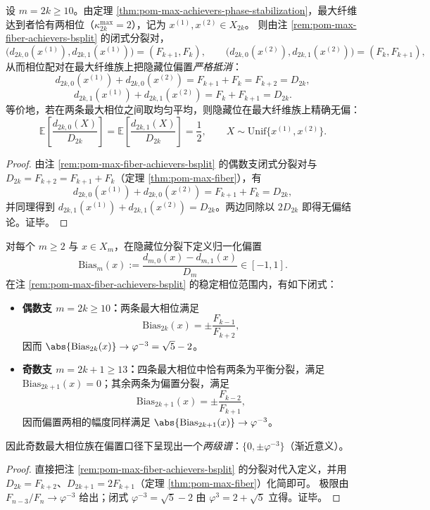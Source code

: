 \begin{corollary}\label{cor:pom-max-fiber-hidden-bit-unbiased}
设 \(m=2k\ge 10\)。由定理 \ref{thm:pom-max-achievers-phase-stabilization}，最大纤维达到者恰有两相位（\(\kappa^{\mathrm{max}}_{2k}=2\)），记为 \(x^{(1)},x^{(2)}\in X_{2k}\)。
则由注 \ref{rem:pom-max-fiber-achievers-bsplit} 的闭式分裂对，
\[
\bigl(d_{2k,0}(x^{(1)}),d_{2k,1}(x^{(1)})\bigr)=(F_{k+1},F_k),
\qquad
\bigl(d_{2k,0}(x^{(2)}),d_{2k,1}(x^{(2)})\bigr)=(F_k,F_{k+1}),
\]
从而相位配对在最大纤维族上把隐藏位偏置\emph{严格抵消}：
\[
d_{2k,0}(x^{(1)})+d_{2k,0}(x^{(2)})=F_{k+1}+F_k=F_{k+2}=D_{2k},
\]
\[
d_{2k,1}(x^{(1)})+d_{2k,1}(x^{(2)})=F_k+F_{k+1}=D_{2k}.
\]
等价地，若在两条最大相位之间取均匀平均，则隐藏位在最大纤维族上精确无偏：
\[
\mathbb{E}\!\left[\frac{d_{2k,0}(X)}{D_{2k}}\right]
=\mathbb{E}\!\left[\frac{d_{2k,1}(X)}{D_{2k}}\right]
=\frac12,\qquad X\sim\mathrm{Unif}\{x^{(1)},x^{(2)}\}.
\]
\end{corollary}

\begin{proof}
由注 \ref{rem:pom-max-fiber-achievers-bsplit} 的偶数支闭式分裂对与 \(D_{2k}=F_{k+2}=F_{k+1}+F_k\)（定理 \ref{thm:pom-max-fiber}），有
\[
d_{2k,0}(x^{(1)})+d_{2k,0}(x^{(2)})=F_{k+1}+F_k=D_{2k},
\]
并同理得到 \(d_{2k,1}(x^{(1)})+d_{2k,1}(x^{(2)})=D_{2k}\)。两边同除以 \(2D_{2k}\) 即得无偏结论。证毕。
\end{proof}

\begin{corollary}\label{cor:pom-max-fiber-hidden-bit-bias-spectrum}
对每个 \(m\ge 2\) 与 \(x\in X_m\)，在隐藏位分裂下定义归一化偏置
\[
\mathrm{Bias}_m(x):=\frac{d_{m,0}(x)-d_{m,1}(x)}{D_m}\in[-1,1].
\]
在注 \ref{rem:pom-max-fiber-achievers-bsplit} 的稳定相位范围内，有如下闭式：
\begin{itemize}
  \item \textbf{偶数支 \(m=2k\ge 10\)：}两条最大相位满足
  \[
  \mathrm{Bias}_{2k}(x)=\pm\frac{F_{k-1}}{F_{k+2}},
  \]
  因而 \(\abs{\mathrm{Bias}_{2k}(x)}\to \varphi^{-3}=\sqrt5-2\)。
  \item \textbf{奇数支 \(m=2k+1\ge 13\)：}四条最大相位中恰有两条为平衡分裂，满足 \(\mathrm{Bias}_{2k+1}(x)=0\)；其余两条为偏置分裂，满足
  \[
  \mathrm{Bias}_{2k+1}(x)=\pm\frac{F_{k-2}}{F_{k+1}},
  \]
  因而偏置两相的幅度同样满足 \(\abs{\mathrm{Bias}_{2k+1}(x)}\to \varphi^{-3}\)。
\end{itemize}
因此奇数最大相位族在偏置口径下呈现出一个\emph{两级谱}：\(\{0,\pm\varphi^{-3}\}\)（渐近意义）。
\end{corollary}
\begin{proof}
直接把注 \ref{rem:pom-max-fiber-achievers-bsplit} 的分裂对代入定义，并用 \(D_{2k}=F_{k+2}\)、\(D_{2k+1}=2F_{k+1}\)（定理 \ref{thm:pom-max-fiber}）化简即可。
极限由 \(F_{n-3}/F_n\to \varphi^{-3}\) 给出；闭式 \(\varphi^{-3}=\sqrt5-2\) 由 \(\varphi^3=2+\sqrt5\) 立得。证毕。
\end{proof}

